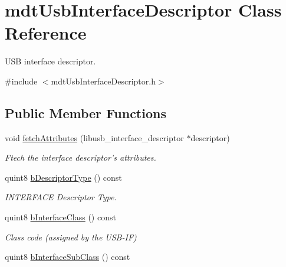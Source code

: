 \hypertarget{classmdt_usb_interface_descriptor}{
\section{mdtUsbInterfaceDescriptor Class Reference}
\label{classmdt_usb_interface_descriptor}
}


USB interface descriptor.  




{\ttfamily \#include $<$mdtUsbInterfaceDescriptor.h$>$}

\subsection*{Public Member Functions}
\begin{DoxyCompactItemize}
\item 
void \hyperlink{classmdt_usb_interface_descriptor_a1050edfdbea744abe0bb4948b16f03fb}{fetchAttributes} (libusb\_\-interface\_\-descriptor $\ast$descriptor)
\begin{DoxyCompactList}\small\item\em Ftech the interface descriptor's attributes. \end{DoxyCompactList}\item 
\hypertarget{classmdt_usb_interface_descriptor_a32e43e99126954ee6b716d1f0a24b60c}{
quint8 \hyperlink{classmdt_usb_interface_descriptor_a32e43e99126954ee6b716d1f0a24b60c}{bDescriptorType} () const }
\label{classmdt_usb_interface_descriptor_a32e43e99126954ee6b716d1f0a24b60c}

\begin{DoxyCompactList}\small\item\em INTERFACE Descriptor Type. \end{DoxyCompactList}\item 
\hypertarget{classmdt_usb_interface_descriptor_a345952007f1822d7decc6b115883a250}{
quint8 \hyperlink{classmdt_usb_interface_descriptor_a345952007f1822d7decc6b115883a250}{bInterfaceClass} () const }
\label{classmdt_usb_interface_descriptor_a345952007f1822d7decc6b115883a250}

\begin{DoxyCompactList}\small\item\em Class code (assigned by the USB-\/IF) \end{DoxyCompactList}\item 
\hypertarget{classmdt_usb_interface_descriptor_aad3fbaacba0b0c32daaffb14d52fd05a}{
quint8 \hyperlink{classmdt_usb_interface_descriptor_aad3fbaacba0b0c32daaffb14d52fd05a}{bInterfaceSubClass} () const }
\label{classmdt_usb_interface_descriptor_aad3fbaacba0b0c32daaffb14d52fd05a}


\end{DoxyCompactItemize}
